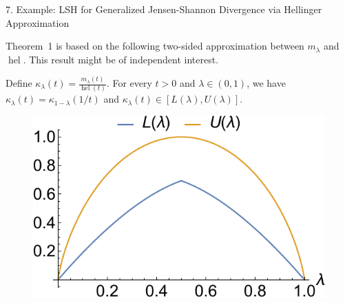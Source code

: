 \documentclass[final]{beamer}
\DeclareMathOperator{\hel}{hel}
\newcommand{\js}[2]{D_{\mathrm{JS}}( #1 \parallel #2 )}
\newcommand{\wjs}[3]{D_{\mathrm{GJS}}^{#1}( #2 \parallel #3 )}
\newlength{\threecolwid}
\begin{document}
\begin{frame}[t]
\begin{columns}[t]
\begin{column}{\threecolwid}
\begin{block}{7. Example: LSH for Generalized Jensen-Shannon 
			Divergence via Hellinger Approximation}
		
		
		
		Theorem~1 is based on the following two-sided approximation 
		 between $ m_\lambda $ and $ \hel $. 
		This result might be of 
		independent interest.
		
			Define $ \kappa_\lambda(t) = \frac{m_\lambda(t)}{\hel(t)} $. For 
			every 
			$ 
			t>0 $ 
			and $ \lambda\in (0,1) $, we have
			$
			\kappa_\lambda(t) = \kappa_{1-\lambda}(1/t)
			$ and $
			\kappa_\lambda(t) \in [L(\lambda), U(\lambda) ]
			$.
		
		\begin{figure}
		    \centering
		    \includegraphics[width=0.5\linewidth]{figures/approximation_ratio.pdf}
		    \label{fig:approximation-ratio}
		\end{figure}
		

\end{block}
\end{column}
\end{columns}
\end{frame}
\end{document}
